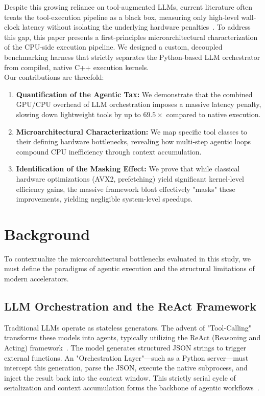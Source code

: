 \documentclass[10pt, letterpaper]{article}
\begin{document}
\noindent Despite this growing reliance on tool-augmented LLMs, current literature often treats the tool-execution pipeline as a black box, measuring only high-level wall-clock latency without isolating the underlying hardware penalties~\cite{ai_nativebench}. To address this gap, this paper presents a first-principles microarchitectural characterization of the CPU-side execution pipeline. We designed a custom, decoupled benchmarking harness that strictly separates the Python-based LLM orchestrator from compiled, native C++ execution kernels. \\

\noindent Our contributions are threefold:
\begin{enumerate}
    \item \textbf{Quantification of the Agentic Tax:} We demonstrate that the combined GPU/CPU overhead of LLM orchestration imposes a massive latency penalty, slowing down lightweight tools by up to $69.5\times$ compared to native execution.
    \item \textbf{Microarchitectural Characterization:} We map specific tool classes to their defining hardware bottlenecks, revealing how multi-step agentic loops compound CPU inefficiency through context accumulation.
    \item \textbf{Identification of the Masking Effect:} We prove that while classical hardware optimizations (AVX2, prefetching) yield significant kernel-level efficiency gains, the massive framework bloat effectively "masks" these improvements, yielding negligible system-level speedups.
\end{enumerate}

\section{Background}
\label{sec:background}
To contextualize the microarchitectural bottlenecks evaluated in this study, we must define the paradigms of agentic execution and the structural limitations of modern accelerators.\\

\subsection{LLM Orchestration and the ReAct Framework}
Traditional LLMs operate as stateless generators. The advent of "Tool-Calling" transforms these models into agents, typically utilizing the ReAct (Reasoning and Acting) framework~\cite{react_yao}. The model generates structured JSON strings to trigger external functions. An "Orchestration Layer"---such as a Python server---must intercept this generation, parse the JSON, execute the native subprocess, and inject the result back into the context window. This strictly serial cycle of serialization and context accumulation forms the backbone of agentic workflows~\cite{paste}.
\end{document}
